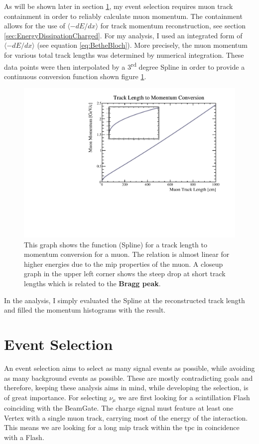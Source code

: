 As will be shown later in section \ref{sec:EventSelection}, my event selection requires muon track containment in order to reliably calculate muon momentum. The containment allows for the use of $\langle -dE/dx \rangle$ for track momentum reconstruction, see section \ref{sec:EnergyDissipationCharged}. For my analysis, I used an integrated form of $\langle -dE/dx \rangle$ (see equation \ref{eq:BetheBloch}). More precisely, the muon momentum for various total track lengths was determined by numerical integration. These data points were then interpolated by a 3\textsuperscript{rd} degree \gls{Spline} in order to provide a continuous conversion function shown figure \ref{fig:MomentumSpline}.
\begin{figure}[htbp]
    \centering
    \includegraphics[width=1.0\textwidth]{images/FirstCCInclusive/TrackLengthMomentumRelation.pdf}
    \caption[Track Length to Momentum Conversion Function]{This graph shows the function (\gls{Spline}) for a track length to momentum conversion for a muon. The relation is almost linear for higher energies due to the \gls{mip} properties of the muon. A closeup graph in the upper left corner shows the steep drop at short track lengths which is related to the \textbf{Bragg peak}.}
    \label{fig:MomentumSpline}
\end{figure}
In the analysis, I simply evaluated the \gls{Spline} at the reconstructed track length and filled the momentum histograms with the result. 

\section{Event Selection} \label{sec:EventSelection}
An event selection aims to select as many signal events as possible, while avoiding as many background events as possible. These are mostly contradicting goals and therefore, keeping these analysis aims in mind, while developing the selection, is of great importance. For selecting $\nu_{\mu}$ we are first looking for a scintillation \gls{Flash} coinciding with the \gls{BeamGate}. The charge signal must feature at least one \gls{Vertex} with a single muon track, carrying most of the energy of the interaction. This means we are looking for a long \gls{mip} track within the \gls{tpc} in coincidence with a \gls{Flash}.

